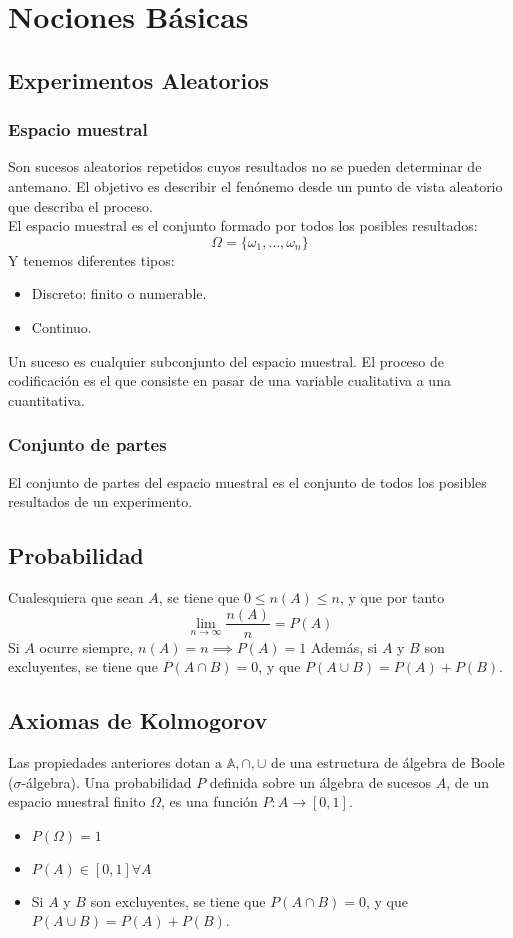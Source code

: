\documentclass{./Probabilidad.tex}
\begin{document}
\chapter{Nociones Básicas}
\section{Experimentos Aleatorios}
\subsection{Espacio muestral}
Son sucesos aleatorios repetidos cuyos resultados no se pueden determinar de
antemano. El objetivo es describir el fenónemo desde un punto de vista aleatorio
que describa el proceso.\\
El espacio muestral es el conjunto formado por todos los posibles resultados:
$$
\Omega = \{ \omega_{1},\dots ,\omega_{n} \}
$$
Y tenemos diferentes tipos:
\begin{itemize}
	\item Discreto: finito o numerable.
	\item Continuo.
\end{itemize}
Un suceso es cualquier subconjunto del espacio muestral.
El proceso de codificación es el que consiste en pasar de una variable cualitativa a una cuantitativa.
\subsection{Conjunto de partes}
El conjunto de partes del espacio muestral es el conjunto de todos los posibles resultados de un experimento.
\section{Probabilidad}
Cualesquiera que sean $A$, se tiene que $0\leq n(A)\leq n$, y que por tanto
$$
\lim_{ n \to \infty } \frac{n(A)}{n}=P(A)
$$
Si $A$ ocurre siempre, $n(A)=n \implies P(A)=1$
Además, si $A$ y $B$ son excluyentes, se tiene que $P(A \cap B) = 0$, y que $P(A \cup B) = P(A)+P(B)$.
\section{Axiomas de Kolmogorov}
Las propiedades anteriores dotan a $\mathbb{A}, \cap, \cup$ de una estructura de álgebra de Boole ($\sigma$-álgebra).
Una probabilidad $P$ definida sobre un álgebra de sucesos $A$, de un espacio muestral finito $\Omega$, es una función $P:A\to[0,1]$.
\begin{itemize}
	\item $P(\Omega)=1$
	\item $P(A) \in [0,1] \forall A$
	\item Si $A$ y $B$ son excluyentes, se tiene que $P(A \cap B) = 0$, y que $P(A \cup B) = P(A)+P(B)$.
\end{itemize}
\end{document}

